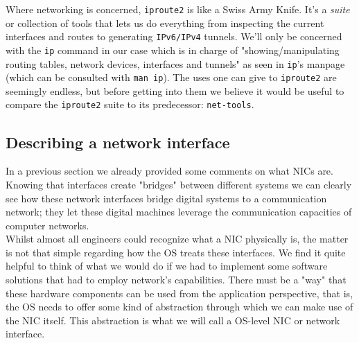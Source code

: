         Where networking is concerned, \texttt{iproute2} is like a Swiss Army Knife. It's a \textit{suite} or collection of tools that lets us do everything from inspecting the current interfaces and routes to generating \texttt{IPv6/IPv4} tunnels. We'll only be concerned with the \texttt{ip} command in our case which is in charge of "showing/manipulating routing tables, network devices, interfaces and tunnels" as seen in \texttt{ip}'s manpage (which can be consulted with \texttt{man ip}). The uses one can give to \texttt{iproute2} are seemingly endless, but before getting into them we believe it would be useful to compare the \texttt{iproute2} suite to its predecessor: \texttt{net-tools}.\\

        \subsection{Describing a network interface}
            In a previous section we already provided some comments on what NICs are. Knowing that interfaces create "bridges" between different systems we can clearly see how these network interfaces bridge digital systems to a communication network; they let these digital machines leverage the communication capacities of computer networks.\\

            Whilst almost all engineers could recognize what a NIC physically is, the matter is not that simple regarding how the OS treats these interfaces. We find it quite helpful to think of what we would do if we had to implement some software solutions that had to employ network's capabilities. There must be a "way" that these hardware components can be used from the application perspective, that is, the OS needs to offer some kind of abstraction through which we can make use of the NIC itself. This abstraction is what we will call a OS-level NIC or network interface.\\

